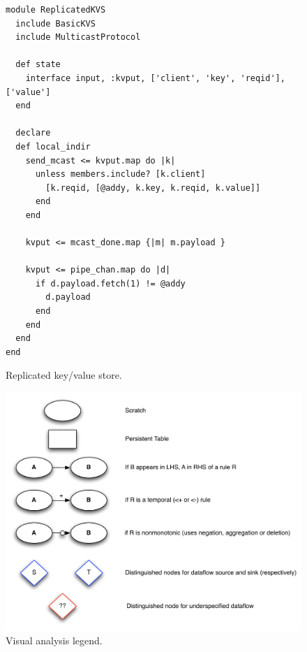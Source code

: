 \begin{figure}[t]
\begin{scriptsize}
\begin{lstlisting}
module ReplicatedKVS
  include BasicKVS
  include MulticastProtocol

  def state
    interface input, :kvput, ['client', 'key', 'reqid'], ['value']
  end

  declare
  def local_indir
    send_mcast <= kvput.map do |k|  
      unless members.include? [k.client]
        [k.reqid, [@addy, k.key, k.reqid, k.value]]                           
      end
    end
    
    kvput <= mcast_done.map {|m| m.payload } 

    kvput <= pipe_chan.map do |d|
      if d.payload.fetch(1) != @addy
        d.payload
      end
    end
  end
end

\end{lstlisting}
\vspace{-10pt}
\caption{Replicated key/value store.}
\label{fig:kvs-repl}
\end{scriptsize}
\vspace{-2pt}
\end{figure}


\begin{figure}[t]
\centering
\includegraphics[width=1.1\linewidth]{fig/mittalk_legend.pdf}
\vspace{-10pt}
\caption{Visual analysis legend.}
\label{fig:analysis-legend}
\vspace{-2pt}
\end{figure}


